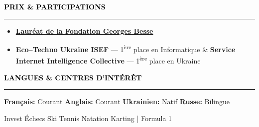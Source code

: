 \documentclass[10pt,english,french]{article}
\newcommand{\cryptoIcon}[1][black]{\textcolor{#1}{\faBitcoin}}
\newlength{\mpwidth}
\newcommand{\cvsection}[1]{
    \vspace{4pt}
    \textbf{\fontsize{9pt}{10pt}\selectfont \textcolor{black}{#1}}
    \vspace{6pt}
    \hrule
    \vspace{6pt}
}
\newcommand{\cvtextnotab}[1]{
    \parbox{1\mpwidth}{#1}
}
\begin{document}
\vspace{-3pt}
\cvsection{PRIX \& PARTICIPATIONS}

\vspace{-6pt}
\begin{itemize}[leftmargin=0.35cm, label=\textbullet, itemsep=0.15em]
    \item \textbf{\href{https://www.fondationbesse.com/}{Lauréat de la Fondation Georges Besse}}
    \item \textbf{Eco\hspace{3pt}--\hspace{3pt}Techno Ukraine ISEF} --- 1\textsuperscript{ère} place en Informatique \& \textbf{Service Internet Intelligence Collective} --- 1\textsuperscript{ère} place en Ukraine
\end{itemize}

\vspace{-3pt}
\cvsection{LANGUES \& CENTRES D'INTÉRÊT}

\vspace{-3pt}
\cvtextnotab{\textbf{Français\!:} Courant \hspace{12pt} \textbf{Anglais\!:} Courant \hspace{12pt} \textbf{Ukrainien\!:} Natif \hspace{20pt} \textbf{Russe\!:} Bilingue}

\vspace{-10pt}
\cvtextnotab{
    Invest \hspace{12pt}
    Échecs \hspace{12pt}
    Ski \hspace{12pt}
    Tennis \hspace{12pt}
    Natation \hspace{12pt}
    Karting | Formula 1
}
\end{document}
